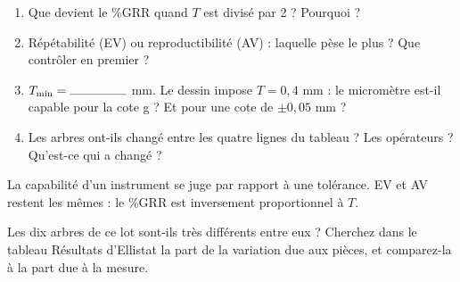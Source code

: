 \documentclass[10pt,a4paper]{article}
\begin{document}
\par
\newpage
{}
\begin{enumerate}[label=\textcolor{cyan}{\textbf{Q\arabic*.}},leftmargin=22pt]
\item Que devient le \%GRR quand $T$ est divisé par 2 ? Pourquoi ?\reponse[2]
\item Répétabilité (EV) ou reproductibilité (AV) : laquelle pèse le plus ? Que contrôler en premier ?\reponse[2]
\item $T_{\min} = \champ{16mm}$ mm. Le dessin impose $T = 0{,}4$ mm : le micromètre est-il capable pour la cote g ? Et pour une cote de $\pm 0{,}05$ mm ?\reponse[2]
\item Les arbres ont-ils changé entre les quatre lignes du tableau ? Les opérateurs ? Qu'est-ce qui a changé ?\reponse[1]
\end{enumerate}
\begin{tcolorbox}[retenir]La capabilité d'un instrument se juge par rapport à une tolérance. EV et AV restent les mêmes : le \%GRR est inversement proportionnel à $T$.\end{tcolorbox}
\begin{tcolorbox}[plus]Les dix arbres de ce lot sont-ils très différents entre eux ? Cherchez dans le tableau Résultats d'Ellistat la part de la variation due aux pièces, et comparez-la à la part due à la mesure.\end{tcolorbox}
\providecommand{\carre}{\fbox{\rule{0pt}{1.1ex}\rule{1.1ex}{0pt}}}
\end{document}
